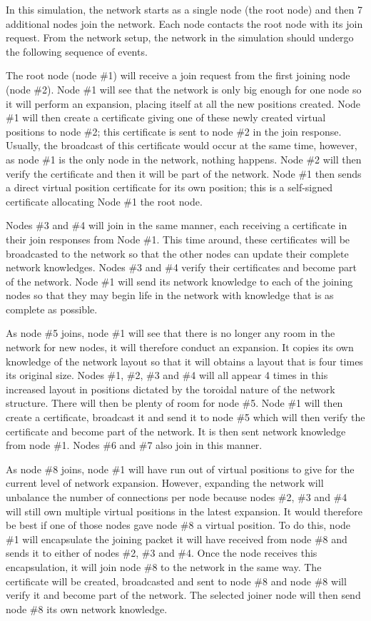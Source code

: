 \documentclass[ %
                    author={Luke Murray},
                supervisor={Dr. Simon Hollis},
                     title={Shadow Peer-to-Peer Networks},
                  subtitle={},
                    degree={MEng},
                      year={2013} ]{thesis}
\begin{document}
In this simulation, the network starts as a single node (the root node) and then 7 additional nodes join the network. Each node contacts the root node with its join request. From the network setup, the network in the simulation should undergo the following sequence of events.

The root node (node \#1) will receive a join request from the first joining node (node \#2). Node \#1 will see that the network is only big enough for one node so it will perform an expansion, placing itself at all the new positions created. Node \#1 will then create a certificate giving one of these newly created virtual positions to node \#2; this certificate is sent to node \#2 in the join response. Usually, the broadcast of this certificate would occur at the same time, however, as node \#1 is the only node in the network, nothing happens. Node \#2 will then verify the certificate and then it will be part of the network. Node \#1 then sends a direct virtual position certificate for its own position; this is a self-signed certificate allocating Node \#1 the root node.

Nodes \#3 and \#4 will join in the same manner, each receiving a certificate in their join responses from Node \#1. This time around, these certificates will be broadcasted to the network so that the other nodes can update their complete network knowledges. Nodes \#3 and \#4 verify their certificates and become part of the network. Node \#1 will send its network knowledge to each of the joining nodes so that they may begin life in the network with knowledge that is as complete as possible.

As node \#5 joins, node \#1 will see that there is no longer any room in the network for new nodes, it will therefore conduct an expansion. It copies its own knowledge of the network layout so that it will obtains a layout that is four times its original size. Nodes \#1, \#2, \#3 and \#4 will all appear 4 times in this increased layout in positions dictated by the toroidal nature of the network structure. There will then be plenty of room for node \#5. Node \#1 will then create a certificate, broadcast it and send it to node \#5 which will then verify the certificate and become part of the network. It is then sent network knowledge from node \#1. Nodes \#6 and \#7 also join in this manner.

As node \#8 joins, node \#1 will have run out of virtual positions to give for the current level of network expansion. However, expanding the network will unbalance the number of connections per node because nodes \#2, \#3 and \#4 will still own multiple virtual positions in the latest expansion. It would therefore be best if one of those nodes gave node \#8 a virtual position. To do this, node \#1 will encapsulate the joining packet it will have received from node \#8 and sends it to either of nodes \#2, \#3 and \#4. Once the node receives this encapsulation, it will join node \#8 to the network in the same way. The certificate will be created, broadcasted and sent to node \#8 and node \#8 will verify it and become part of the network. The selected joiner node will then send node \#8 its own network knowledge.
\end{document}
